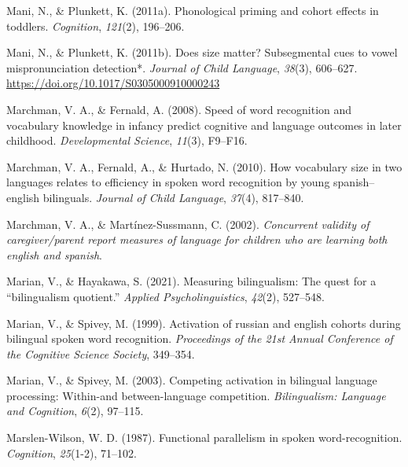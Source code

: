 \documentclass[
  12pt,
  b5paperpaper,
  twoside]{scrreprt}
\newlength{\cslhangindent}
\newlength{\cslentryspacingunit} %
\newenvironment{CSLReferences}[2] %
 {%
  \setlength{\parindent}{0pt}
  \ifodd #1
  \let\oldpar\par
  \def\par{\hangindent=\cslhangindent\oldpar}
  \fi
  \setlength{\parskip}{#2\cslentryspacingunit}
 }%
 {}
\begin{document}
\begin{CSLReferences}{1}{0}
\leavevmode{}%
Mani, N., \& Plunkett, K. (2011a). Phonological priming and cohort
effects in toddlers. \emph{Cognition}, \emph{121}(2), 196--206.

\leavevmode{}%
Mani, N., \& Plunkett, K. (2011b). Does size matter? Subsegmental cues
to vowel mispronunciation detection*. \emph{Journal of Child Language},
\emph{38}(3), 606--627. \url{https://doi.org/10.1017/S0305000910000243}

\leavevmode{}%
Marchman, V. A., \& Fernald, A. (2008). Speed of word recognition and
vocabulary knowledge in infancy predict cognitive and language outcomes
in later childhood. \emph{Developmental Science}, \emph{11}(3), F9--F16.

\leavevmode{}%
Marchman, V. A., Fernald, A., \& Hurtado, N. (2010). How vocabulary size
in two languages relates to efficiency in spoken word recognition by
young spanish--english bilinguals. \emph{Journal of Child Language},
\emph{37}(4), 817--840.

\leavevmode{}%
Marchman, V. A., \& Martínez-Sussmann, C. (2002). \emph{Concurrent
validity of caregiver/parent report measures of language for children
who are learning both english and spanish}.

\leavevmode{}%
Marian, V., \& Hayakawa, S. (2021). Measuring bilingualism: The quest
for a {``bilingualism quotient.''} \emph{Applied Psycholinguistics},
\emph{42}(2), 527--548.

\leavevmode{}%
Marian, V., \& Spivey, M. (1999). Activation of russian and english
cohorts during bilingual spoken word recognition. \emph{Proceedings of
the 21st Annual Conference of the Cognitive Science Society}, 349--354.

\leavevmode{}%
Marian, V., \& Spivey, M. (2003). Competing activation in bilingual
language processing: Within-and between-language competition.
\emph{Bilingualism: Language and Cognition}, \emph{6}(2), 97--115.

\leavevmode{}%
Marslen-Wilson, W. D. (1987). Functional parallelism in spoken
word-recognition. \emph{Cognition}, \emph{25}(1-2), 71--102.


\end{CSLReferences}
\end{document}
